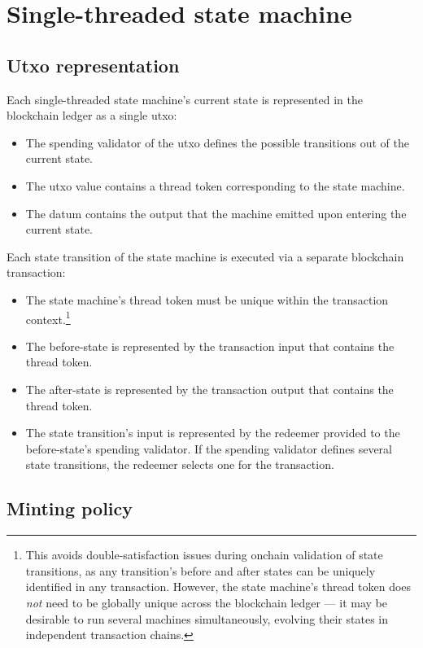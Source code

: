 \documentclass[../midgard.tex]{subfiles}
\begin{document}
\section{Single-threaded state machine}
\label{h:single-threaded-state-machine}

\subsection{Utxo representation}
\label{h:single-threaded-state-machine-utxo-representation}

Each single-threaded state machine's current state is represented in the blockchain ledger as a single utxo:
\begin{itemize}
    \item The spending validator of the utxo defines the possible transitions out of the current state.
    \item The utxo value contains a thread token corresponding to the state machine.
    \item The datum contains the output that the machine emitted upon entering the current state.
\end{itemize}

Each state transition of the state machine is executed via a separate blockchain transaction:
\begin{itemize}
    \item The state machine's thread token must be unique within the transaction context.\footnote{This avoids double-satisfaction issues during onchain validation of state transitions, as any transition's before and after states can be uniquely identified in any transaction.
      However, the state machine's thread token does \emph{not} need to be globally unique across the blockchain ledger --- it may be desirable to run several machines simultaneously, evolving their states in independent transaction chains.}
    \item The before-state is represented by the transaction input that contains the thread token.
    \item The after-state is represented by the transaction output that contains the thread token.
    \item The state transition's input is represented by the redeemer provided to the before-state's spending validator.
      If the spending validator defines several state transitions, the redeemer selects one for the transaction.
\end{itemize}

\subsection{Minting policy}
\label{h:single-threaded-state-machine-minting-policy}
\end{document}
